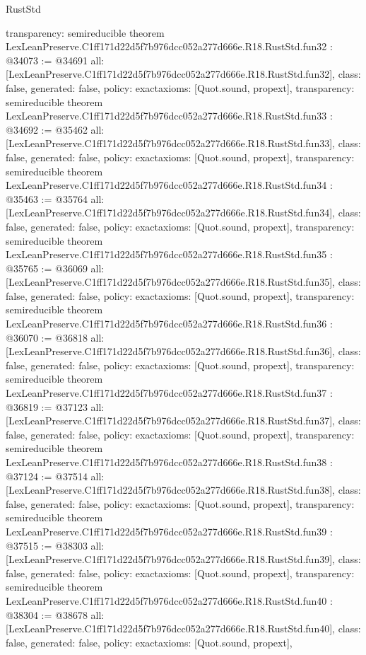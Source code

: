 \begin{lexlean}{RustStd}
\begin{coremodule}
{  transparency: semireducible
}
theorem LexLeanPreserve.C1ff171d22d5f7b976dcc052a277d666e.R18.RustStd.fun32 : @34073 := @34691 {
  all: [LexLeanPreserve.C1ff171d22d5f7b976dcc052a277d666e.R18.RustStd.fun32],
  class: false,
  generated: false,
  policy: exact{axioms: [Quot.sound, propext]},
  transparency: semireducible
}
theorem LexLeanPreserve.C1ff171d22d5f7b976dcc052a277d666e.R18.RustStd.fun33 : @34692 := @35462 {
  all: [LexLeanPreserve.C1ff171d22d5f7b976dcc052a277d666e.R18.RustStd.fun33],
  class: false,
  generated: false,
  policy: exact{axioms: [Quot.sound, propext]},
  transparency: semireducible
}
theorem LexLeanPreserve.C1ff171d22d5f7b976dcc052a277d666e.R18.RustStd.fun34 : @35463 := @35764 {
  all: [LexLeanPreserve.C1ff171d22d5f7b976dcc052a277d666e.R18.RustStd.fun34],
  class: false,
  generated: false,
  policy: exact{axioms: [Quot.sound, propext]},
  transparency: semireducible
}
theorem LexLeanPreserve.C1ff171d22d5f7b976dcc052a277d666e.R18.RustStd.fun35 : @35765 := @36069 {
  all: [LexLeanPreserve.C1ff171d22d5f7b976dcc052a277d666e.R18.RustStd.fun35],
  class: false,
  generated: false,
  policy: exact{axioms: [Quot.sound, propext]},
  transparency: semireducible
}
theorem LexLeanPreserve.C1ff171d22d5f7b976dcc052a277d666e.R18.RustStd.fun36 : @36070 := @36818 {
  all: [LexLeanPreserve.C1ff171d22d5f7b976dcc052a277d666e.R18.RustStd.fun36],
  class: false,
  generated: false,
  policy: exact{axioms: [Quot.sound, propext]},
  transparency: semireducible
}
theorem LexLeanPreserve.C1ff171d22d5f7b976dcc052a277d666e.R18.RustStd.fun37 : @36819 := @37123 {
  all: [LexLeanPreserve.C1ff171d22d5f7b976dcc052a277d666e.R18.RustStd.fun37],
  class: false,
  generated: false,
  policy: exact{axioms: [Quot.sound, propext]},
  transparency: semireducible
}
theorem LexLeanPreserve.C1ff171d22d5f7b976dcc052a277d666e.R18.RustStd.fun38 : @37124 := @37514 {
  all: [LexLeanPreserve.C1ff171d22d5f7b976dcc052a277d666e.R18.RustStd.fun38],
  class: false,
  generated: false,
  policy: exact{axioms: [Quot.sound, propext]},
  transparency: semireducible
}
theorem LexLeanPreserve.C1ff171d22d5f7b976dcc052a277d666e.R18.RustStd.fun39 : @37515 := @38303 {
  all: [LexLeanPreserve.C1ff171d22d5f7b976dcc052a277d666e.R18.RustStd.fun39],
  class: false,
  generated: false,
  policy: exact{axioms: [Quot.sound, propext]},
  transparency: semireducible
}
theorem LexLeanPreserve.C1ff171d22d5f7b976dcc052a277d666e.R18.RustStd.fun40 : @38304 := @38678 {
  all: [LexLeanPreserve.C1ff171d22d5f7b976dcc052a277d666e.R18.RustStd.fun40],
  class: false,
  generated: false,
  policy: exact{axioms: [Quot.sound, propext]},
}
\end{coremodule}
\end{lexlean}
